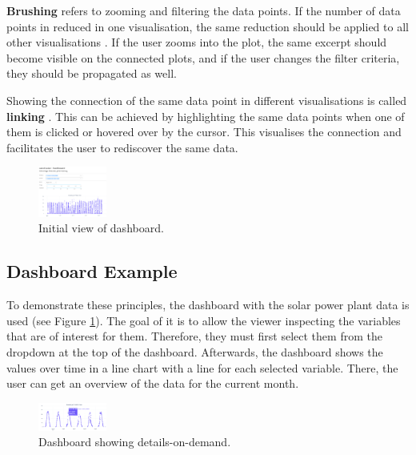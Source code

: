 \documentclass[11pt]{article}
\begin{document}
\textbf{Brushing} refers to zooming and filtering the data points. If the number of data points in reduced in one visualisation, the same reduction should be applied to all other visualisations \parencite{becker_brushing_1987}. If the user zooms into the plot, the same excerpt should become visible on the connected plots, and if the user changes the filter criteria, they should be propagated as well.

Showing the connection of the same data point in different visualisations is called \textbf{linking} \parencite{noauthor_linking_nodate}. This can be achieved by highlighting the same data points when one of them is clicked or hovered over by the cursor. This visualises the connection and facilitates the user to rediscover the same data.

\begin{figure}
    \includegraphics[width=0.2\textwidth]{./dashboard.png}
    \caption{Initial view of dashboard.}
    \label{dashboard}
\end{figure}

\subsection{Dashboard Example}

To demonstrate these principles, the dashboard with the solar power plant data is used (see Figure \ref{dashboard}). The goal of it is to allow the viewer inspecting the variables that are of interest for them. Therefore, they must first select them from the dropdown at the top of the dashboard. Afterwards, the dashboard shows the values over time in a line chart with a line for each selected variable. There, the user can get an overview of the data for the current month.

\begin{figure}
    \includegraphics[width=0.2\textwidth]{./dashboard-details.png}
    \caption{Dashboard showing details-on-demand.}
    \label{dashboard-details}
\end{figure}
\end{document}
